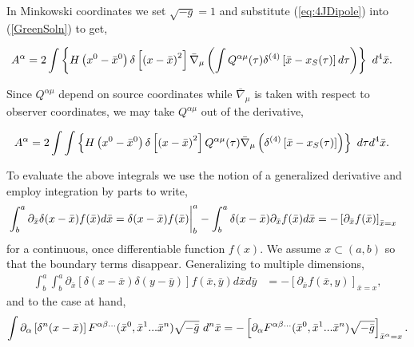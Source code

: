 In Minkowski coordinates we set $\sqrt{-g}=1$ and substitute (\ref{eq:4JDipole}) into (\ref{GreenSoln}) to get,
\begin{widetext}
\begin{align}
A^{\alpha} &= 2 \int \left \{
 H \left( x^0  -  \bar{x}^0 \right)  \delta \left[ \left({x}
   -{\bar{x}}\right)^2 \right]
\bar{\nabla}_\mu\left (
\int  Q^{\alpha \mu}(\tau) \delta^{(4)}\left[ {\bar{x}}
  -{x_S}(\tau) \right]   d \tau
\right )   \right \}
\hbox{  }
d^4\bar{{x}} .
\end{align}

Since $Q^{\alpha \mu}$ depend on source coordinates while $\bar{\nabla}_\mu$ is taken with respect to observer coordinates, we may take $Q^{\alpha \mu}$ out of the derivative,

\begin{align}
A^{\alpha} &= 2 \int \int \left \{
 H \left( x^0  -  \bar{x}^0 \right)  \delta \left[ \left({x}
   -{\bar{x}}\right)^2 \right]
  Q^{\alpha \mu}(\tau) \bar{\nabla}_\mu\left ( \delta^{(4)}\left[ {\bar{x}}
  -{x_S}(\tau) \right] 
\right )   \right \}
\hbox{  }
  d \tau d^4\bar{{x}} .
\end{align}




To evaluate the above integrals we use the notion of a generalized derivative and employ integration by parts to write,
\begin{align}
&\int^a_b{  \partial_{\bar{x}} \delta(x-\bar{x}) f(\bar{x}) d\bar{x} } = 
 \delta(x-\bar{x}) f(\bar{x}) \bigg{|}^a_b  -  \int^a_b{  \delta(x-\bar{x}) \partial_{\bar{x}}  f(\bar{x}) d\bar{x} }  =  -\left[ \partial_{\bar{x}} f(\bar{x}) \right]_{\bar{x}=x}
\end{align}
for a continuous, once differentiable function $f(x)$. We assume $x \subset (a,b)$ so that the boundary terms disappear.
Generalizing to multiple dimensions, 
\begin{align}
\int^a_b{\int^a_b{ \partial_{\bar{x}} \left[ \delta(x-\bar{x})  \delta(y-\bar{y}) \right]f(\bar{x}, \bar{y}) d\bar{x} d\bar{y}}} &=  -\left[\partial_{\bar{x}} f(\bar{x},y) \right]_{\bar{x}=x},
\label{KronD2}
\end{align}
and to the case at hand,
\begin{align}
\int{ \partial_{\alpha} \left[ \delta^{n}({x}-{\bar{x}}) \right] F^{\alpha \beta ...}(\bar{x}^0, \bar{x}^1...\bar{x}^n) \sqrt{-\bar{g}}  \ d^{n}\bar{x}} =   -\left[\partial_{\alpha} F^{\alpha \beta ...}(\bar{x}^0, \bar{x}^1 ... \bar{x}^n) \sqrt{-\bar{g}} \right]_{\bar{x}^{\alpha}=x}.
\label{KronD}
\end{align}





\end{widetext}
